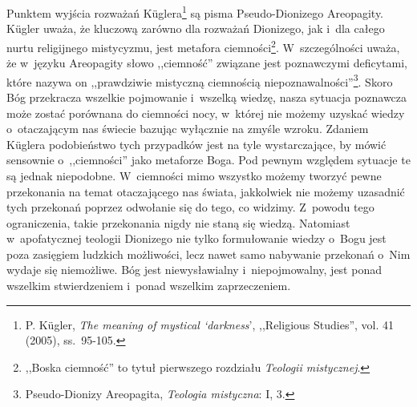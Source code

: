 Punktem wyjścia rozważań Küglera\footnote{P. Kügler, \textit{The meaning of mystical ‘darkness}', ,,Religious Studies'', vol. 41 (2005), ss.~95-105.} są pisma Pseudo-Dionizego Areopagity. Kügler uważa, że kluczową zarówno dla rozważań Dionizego, jak i~dla całego nurtu religijnego mistycyzmu, jest metafora ciemności\footnote{,,Boska ciemność'' to tytuł pierwszego rozdziału \textit{Teologii mistycznej}.}. W~szczególności uważa, że w~języku Areopagity słowo ,,ciemność'' związane jest poznawczymi deficytami, które nazywa on ,,prawdziwie mistyczną ciemnością niepoznawalności''\footnote{Pseudo-Dionizy Areopagita, \textit{Teologia mistyczna}: I, 3.}. Skoro Bóg przekracza wszelkie pojmowanie i~wszelką wiedzę, nasza sytuacja poznawcza może zostać porównana do ciemności nocy, w~której nie możemy uzyskać wiedzy o~otaczającym nas świecie bazując wyłącznie na zmyśle wzroku. Zdaniem Küglera podobieństwo tych przypadków jest na tyle wystarczające, by mówić sensownie o~,,ciemności'' jako metaforze Boga. Pod pewnym względem sytuacje te są jednak niepodobne. W~ciemności mimo wszystko możemy tworzyć pewne przekonania na temat otaczającego nas świata, jakkolwiek nie możemy uzasadnić tych przekonań poprzez odwołanie się do tego, co widzimy. Z~powodu tego ograniczenia, takie przekonania nigdy nie staną się wiedzą. Natomiast w~apofatycznej teologii Dionizego nie tylko formułowanie wiedzy o~Bogu jest poza zasięgiem ludzkich możliwości, lecz nawet samo nabywanie przekonań o~Nim wydaje się niemożliwe. Bóg jest niewysławialny i~niepojmowalny, jest ponad wszelkim stwierdzeniem i~ponad wszelkim zaprzeczeniem.

